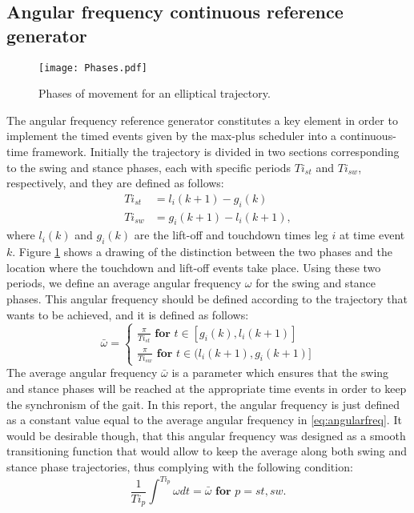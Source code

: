 \documentclass[main.tex]{subfiles}
\begin{document}
\subsection{Angular frequency continuous reference generator}
\begin{figure}[b]\centering
		\texttt{[image: Phases.pdf]}
		\caption{Phases of movement for an elliptical trajectory.
			\label{fig:Phases} }
\end{figure}
The angular frequency reference generator constitutes a key element in order to implement the timed events given by the max-plus scheduler into a continuous-time framework. Initially the trajectory is divided in two sections corresponding to the swing and stance phases, each with specific periods $Ti_{st}$ and $Ti_{sw}$, respectively, and they are defined as follows:
\begin{align}
Ti_{st} &= l_i(k+1) - g_i(k) \\
Ti_{sw} &= g_i(k+1) - l_i(k+1),
\end{align}
where $l_i(k)$ and $g_i(k)$ are the lift-off and touchdown times leg $i$ at time event $k$. Figure \ref{fig:Phases} shows a drawing of the distinction between the two phases and the location where the touchdown and lift-off events take place. Using these two periods, we define an average angular frequency $\omega$ for the swing and stance phases. This angular frequency should be defined according to the trajectory that wants to be achieved, and it is defined as follows:
\begin{equation}
\bar{\omega} = \begin{cases}
\frac{\pi}{Ti_{st}} \textbf{ for } t \in [g_i(k),l_i(k+1)] \\
\frac{\pi}{Ti_{sw}} \textbf{ for } t \in (l_i(k+1),g_i(k+1)] 
\end{cases}\label{eq:angularfreq}
\end{equation}
The average angular frequency $\bar{\omega}$ is a parameter which ensures that the swing and stance phases will be reached at the appropriate time events in order to keep the synchronism of the gait. In this report, the angular frequency is just defined as a constant value equal to the average angular frequency in \ref{eq:angularfreq}. It would be desirable though, that this angular frequency was designed as a smooth transitioning function that would allow to keep the average along both swing and stance phase trajectories, thus complying with the following condition:
\begin{equation}
\frac{1}{Ti_{p}}\int^{Ti_{p}} \omega dt = \bar{\omega} \textbf{ for } p = st,sw.\label{eq:angularfrequencycondition}
\end{equation} 
\end{document}
